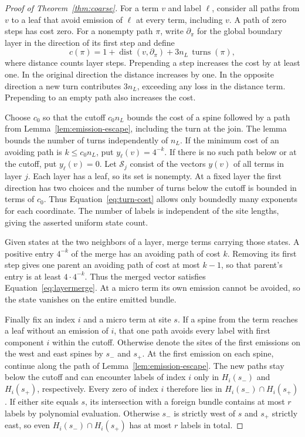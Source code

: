 \begin{proof}[Proof of Theorem~\ref{thm:coarse}]
For a term \(v\) and label \(\ell\), consider all paths from \(v\) to a
leaf that avoid emission of \(\ell\) at every term, including \(v\).
A path of zero steps has cost zero. For a nonempty path \(\pi\), write
\(\partial_\pi\) for the global boundary layer in the direction of its
first step and define
\begin{equation}\label{eq:turn-cost}
 c(\pi)=1+\operatorname{dist}(v,\partial_\pi)
                   +3n_L\,\operatorname{turns}(\pi),
\end{equation}
where distance counts layer steps. Prepending a step increases the cost
by at least one. In the original direction the distance increases by one.
In the opposite direction a new turn contributes \(3n_L\), exceeding any
loss in the distance term. Prepending to an empty path also increases
the cost.

Choose \(c_0\) so that the cutoff \(c_0 n_L\) bounds the cost of a
spine followed by a path from Lemma~\ref{lem:emission-escape}, including
the turn at the join. The lemma bounds the number of turns independently
of \(n_L\). If the minimum cost of an avoiding path is \(k\le c_0 n_L\),
put \(y_\ell(v)=4^{-k}\). If there is no such path below or at the cutoff,
put \(y_\ell(v)=0\). Let \(\mathcal S_j\) consist of the vectors \(y(v)\)
of all terms in layer \(j\). Each layer has a leaf, so its set is
nonempty. At a fixed layer the first direction has two choices and the
number of turns below the cutoff is bounded in terms of \(c_0\). Thus
Equation~\eqref{eq:turn-cost} allows only boundedly many exponents for
each coordinate. The number of labels is independent of the site
lengths, giving the asserted uniform state count.

Given states at the two neighbors of a layer, merge terms carrying those states.
A positive entry \(4^{-k}\) of the merge has an avoiding path of cost
\(k\). Removing its first step gives one parent an avoiding path of cost
at most \(k-1\), so that parent's entry is at least \(4\cdot4^{-k}\).
Thus the merged vector satisfies Equation~\eqref{eq:layermerge}. At a
micro term its own emission cannot be avoided, so the state vanishes on
the entire emitted bundle.

Finally fix an index \(i\) and a micro term at site \(s\). If a spine
from the term reaches a leaf without an emission of \(i\), that one
path avoids every label with first component \(i\) within the cutoff.
Otherwise denote the sites of the first emissions on the west and east
spines by \(s_-\) and \(s_+\). At the first emission on each spine,
continue along the path of Lemma~\ref{lem:emission-escape}. The new
paths stay below the cutoff and can encounter labels of index \(i\)
only in \(H_i(s_-)\) and \(H_i(s_+)\), respectively. Every zero of
index \(i\) therefore lies in \(H_i(s_-)\cap H_i(s_+)\). If either
site equals \(s\), its intersection with a foreign bundle contains at
most \(r\) labels by polynomial evaluation. Otherwise \(s_-\) is
strictly west of \(s\) and \(s_+\) strictly east, so even
\(H_i(s_-)\cap H_i(s_+)\) has at most \(r\) labels in total.
\end{proof}
